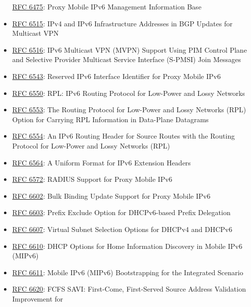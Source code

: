 \documentclass[
]{article}
\begin{document}
\begin{itemize}
  \href{https://www.rfc-editor.org/info/rfc6475}{RFC 6475}: Proxy Mobile
  IPv6 Management Information Base
\item
  \href{https://www.rfc-editor.org/info/rfc6515}{RFC 6515}: IPv4 and
  IPv6 Infrastructure Addresses in BGP Updates for Multicast VPN
\item
  \href{https://www.rfc-editor.org/info/rfc6516}{RFC 6516}: IPv6
  Multicast VPN (MVPN) Support Using PIM Control Plane and Selective
  Provider Multicast Service Interface (S-PMSI) Join Messages
\item
  \href{https://www.rfc-editor.org/info/rfc6543}{RFC 6543}: Reserved
  IPv6 Interface Identifier for Proxy Mobile IPv6
\item
  \href{https://www.rfc-editor.org/info/rfc6550}{RFC 6550}: RPL: IPv6
  Routing Protocol for Low-Power and Lossy Networks
\item
  \href{https://www.rfc-editor.org/info/rfc6553}{RFC 6553}: The Routing
  Protocol for Low-Power and Lossy Networks (RPL) Option for Carrying
  RPL Information in Data-Plane Datagrams
\item
  \href{https://www.rfc-editor.org/info/rfc6554}{RFC 6554}: An IPv6
  Routing Header for Source Routes with the Routing Protocol for
  Low-Power and Lossy Networks (RPL)
\item
  \href{https://www.rfc-editor.org/info/rfc6564}{RFC 6564}: A Uniform
  Format for IPv6 Extension Headers
\item
  \href{https://www.rfc-editor.org/info/rfc6572}{RFC 6572}: RADIUS
  Support for Proxy Mobile IPv6
\item
  \href{https://www.rfc-editor.org/info/rfc6602}{RFC 6602}: Bulk Binding
  Update Support for Proxy Mobile IPv6
\item
  \href{https://www.rfc-editor.org/info/rfc6603}{RFC 6603}: Prefix
  Exclude Option for DHCPv6-based Prefix Delegation
\item
  \href{https://www.rfc-editor.org/info/rfc6607}{RFC 6607}: Virtual
  Subnet Selection Options for DHCPv4 and DHCPv6
\item
  \href{https://www.rfc-editor.org/info/rfc6610}{RFC 6610}: DHCP Options
  for Home Information Discovery in Mobile IPv6 (MIPv6)
\item
  \href{https://www.rfc-editor.org/info/rfc6611}{RFC 6611}: Mobile IPv6
  (MIPv6) Bootstrapping for the Integrated Scenario
\item
  \href{https://www.rfc-editor.org/info/rfc6620}{RFC 6620}: FCFS SAVI:
  First-Come, First-Served Source Address Validation Improvement for

\end{itemize}
\end{document}
